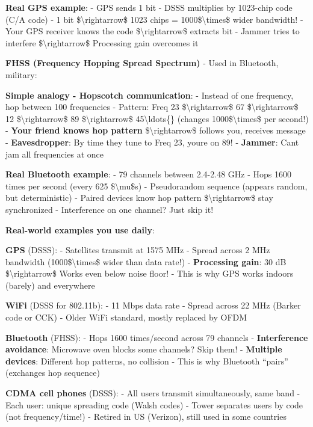 \textbf{Real GPS example}: - GPS sends 1 bit - DSSS multiplies by
1023-chip code (C/A code) - 1 bit \$\textbackslash rightarrow\$ 1023
chips = 1000\$\textbackslash times\$ wider bandwidth! - Your GPS
receiver knows the code \$\textbackslash rightarrow\$ extracts bit -
Jammer tries to interfere \$\textbackslash rightarrow\$ Processing gain
overcomes it

\textbf{FHSS (Frequency Hopping Spread Spectrum)} - Used in Bluetooth,
military:

\textbf{Simple analogy - Hopscotch communication}: - Instead of one
frequency, hop between 100 frequencies - Pattern: Freq 23
\$\textbackslash rightarrow\$ 67 \$\textbackslash rightarrow\$ 12
\$\textbackslash rightarrow\$ 89 \$\textbackslash rightarrow\$
45\textbackslash ldots\{\} (changes 1000\$\textbackslash times\$ per
second!) - \textbf{Your friend knows hop pattern}
\$\textbackslash rightarrow\$ follows you, receives message -
\textbf{Eavesdropper}: By time they tune to Freq 23,
you\textquotesingle re on 89! - \textbf{Jammer}: Can\textquotesingle t
jam all frequencies at once

\textbf{Real Bluetooth example}: - 79 channels between 2.4-2.48 GHz -
Hops 1600 times per second (every 625 \$\textbackslash mu\$s) -
Pseudorandom sequence (appears random, but deterministic) - Paired
devices know hop pattern \$\textbackslash rightarrow\$ stay synchronized
- Interference on one channel? Just skip it!

\textbf{Real-world examples you use daily}:

\textbf{GPS} (DSSS): - Satellites transmit at 1575 MHz - Spread across 2
MHz bandwidth (1000\$\textbackslash times\$ wider than data rate!) -
\textbf{Processing gain}: 30 dB \$\textbackslash rightarrow\$ Works even
below noise floor! - This is why GPS works indoors (barely) and
everywhere

\textbf{WiFi} (DSSS for 802.11b): - 11 Mbps data rate - Spread across 22
MHz (Barker code or CCK) - Older WiFi standard, mostly replaced by OFDM

\textbf{Bluetooth} (FHSS): - Hops 1600 times/second across 79 channels -
\textbf{Interference avoidance}: Microwave oven blocks some channels?
Skip them! - \textbf{Multiple devices}: Different hop patterns, no
collision - This is why Bluetooth ``pairs'' (exchanges hop sequence)

\textbf{CDMA cell phones} (DSSS): - All users transmit simultaneously,
same band - Each user: unique spreading code (Walsh codes) - Tower
separates users by code (not frequency/time!) - Retired in US (Verizon),
still used in some countries

